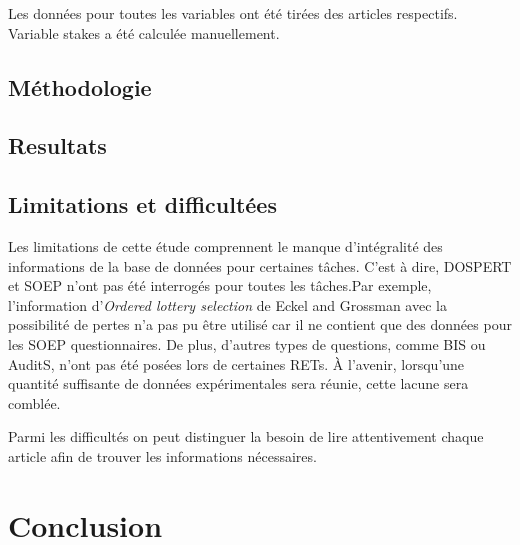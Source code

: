 \documentclass[12pt]{article}
\begin{document}
Les données pour toutes les variables ont été tirées des articles
respectifs. Variable stakes a été calculée manuellement.

\subsection{Méthodologie}

\subsection{Resultats}

\subsection{Limitations et difficultées}

Les limitations de cette étude comprennent le manque d'intégralité des
informations de la base de données pour certaines tâches. C'est à dire,
DOSPERT et SOEP n'ont pas été interrogés pour toutes les tâches.Par
exemple, l'information d'\emph{Ordered lottery selection} de Eckel and
Grossman avec la possibilité de pertes n'a pas pu être utilisé car il ne
contient que des données pour les SOEP questionnaires. De plus, d'autres
types de questions, comme BIS ou AuditS, n'ont pas été posées lors de
certaines RETs. À l'avenir, lorsqu'une quantité suffisante de données
expérimentales sera réunie, cette lacune sera comblée.

Parmi les difficultés on peut distinguer la besoin de lire attentivement
chaque article afin de trouver les informations nécessaires.

\section{Conclusion}

\label{sec:fifth}



\end{document}
